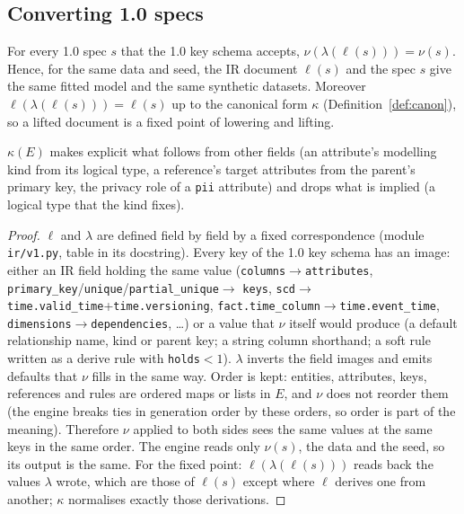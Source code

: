 \subsection{Converting 1.0 specs}
\begin{proposition}\label{prop:irround}
For every 1.0 spec $s$ that the 1.0 key schema accepts, $\nu(\lambda(\ell(s)))=\nu(s)$. Hence, for the same data
and seed, the IR document $\ell(s)$ and the spec $s$ give the same fitted model and the same synthetic datasets.
Moreover $\ell(\lambda(\ell(s)))=\ell(s)$ up to the canonical form $\kappa$ (Definition~\ref{def:canon}), so a lifted
document is a fixed point of lowering and lifting.
\end{proposition}
\begin{definition}\label{def:canon}
$\kappa(E)$ makes explicit what follows from other fields (an attribute's modelling kind from its logical type,
a reference's target attributes from the parent's primary key, the privacy role of a \texttt{pii} attribute) and
drops what is implied (a logical type that the kind fixes).
\end{definition}
\begin{proof}
$\ell$ and $\lambda$ are defined field by field by a fixed correspondence (module \texttt{ir/v1.py}, table in its
docstring). Every key of the 1.0 key schema has an image: either an IR field holding the same value
(\texttt{columns}$\to$\texttt{attributes}, \texttt{primary\_key}/\texttt{unique}/\texttt{partial\_unique}$\to$
\texttt{keys}, \texttt{scd}$\to$\texttt{time.valid\_time}+\texttt{time.versioning},
\texttt{fact.time\_column}$\to$\texttt{time.event\_time}, \texttt{dimensions}$\to$\texttt{dependencies}, \ldots) or
a value that $\nu$ itself would produce (a default relationship name, kind or parent key; a string column
shorthand; a soft rule written as a derive rule with \texttt{holds}$<1$). $\lambda$ inverts the field images and
emits defaults that $\nu$ fills in the same way. Order is kept: entities, attributes, keys, references and rules
are ordered maps or lists in $E$, and $\nu$ does not reorder them (the engine breaks ties in generation order by
these orders, so order is part of the meaning). Therefore $\nu$ applied to both sides sees the same values at the
same keys in the same order. The engine reads only $\nu(s)$, the data and the seed, so its output is the same.
For the fixed point: $\ell(\lambda(\ell(s)))$ reads back the values $\lambda$ wrote, which are those of $\ell(s)$
except where $\ell$ derives one from another; $\kappa$ normalises exactly those derivations.
\end{proof}
